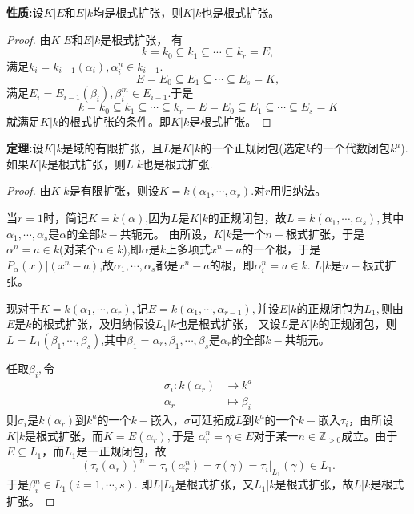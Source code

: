 \documentclass[UTF8]{article}
\begin{document}
\textbf{性质:}设$K|E$和$E|k$均是根式扩张，则$K|k$也是根式扩张。
\begin{proof}
	由$K|E$和$E|k$是根式扩张，
	有
	$$
	k=k_{0}\subseteq k_{1}\subseteq \cdots\subseteq k_{r}=E,
	$$
	满足$k_{i}=k_{i-1}(\alpha_{i}),\alpha_{i}^{n}\in k_{i-1}.$
	$$
	E=E_{0}\subseteq E_{1}\subseteq \cdots\subseteq E_{s}=K,
	$$
	满足$E_{i}=E_{i-1}(\beta_{i}),\beta_{i}^{m}\in E_{i-1}.$于是
	$$
	k=k_{0}\subseteq k_{1}\subseteq \cdots\subseteq k_{r}=E=E_{0}\subseteq E_{1}\subseteq \cdots\subseteq E_{s}=K
	$$
	就满足$K|k$的根式扩张的条件。即$K|k$是根式扩张。
\end{proof}

\textbf{定理:}设$K|k$是域的有限扩张，且$L$是$K|k$的一个正规闭包(选定$k$的一个代数闭包$k^{a}$).如果$K|k$是根式扩张，则$L|k$也是根式扩张.
\begin{proof}
	由$K|k$是有限扩张，则设$K=k(\alpha_{1},\cdots,\alpha_{r}).$对$r$用归纳法。
	
	
	当$r=1$时，简记$K=k(\alpha)$,因为$L$是$K|k$的正规闭包，故$L=k(\alpha_{1},\cdots,\alpha_{s}),$其中$\alpha_{1},\cdots,\alpha_{s}$是$\alpha$的全部$k-$共轭元。
	由所设，$K|k$是一个$n-$根式扩张，于是$\alpha^{n}=a\in k$(对某个$a\in k$),即$\alpha$是$k$上多项式$x^{n}-a$的一个根，于是$P_{\alpha}(x)|(x^{n}-a)$,故$\alpha_{1},\cdots,\alpha_{s}$都是$x^{n}-a$的根，即$\alpha_{i}^{n}=a\in k.$ $L|k$是$n-$根式扩张。
	
	
	现对于$K=k(\alpha_{1},\cdots,\alpha_{r}),$记$E=k(\alpha_{1},\cdots,\alpha_{r-1}),$并设$E|k$的正规闭包为$L_{1},$则由$E$是$k$的根式扩张，及归纳假设$L_{1}|k$也是根式扩张，
	又设$L$是$K|k$的正规闭包，则$L=L_{1}(\beta_{1},\cdots,\beta_{s})$,其中$\beta_{1}=\alpha_{r},\beta_{1},\cdots,\beta_{s}$是$\alpha_{r}$的全部$k-$共轭元。
	
	
	任取$\beta_{i},$令
	\[
	\begin{split}
	\sigma_{i}:k(\alpha_{r})&\rightarrow k^{a}\\
	\alpha_{r}&\mapsto\beta_{i}
	\end{split}
	\]
	则$\sigma_{i}$是$k(\alpha_{r})$到$k^{a}$的一个$k-$嵌入，$\sigma$可延拓成$L$到$k^{a}$的一个$k-$嵌入$\tau_{i}$，由所设$K|k$是根式扩张，而$K=E(\alpha_{r}),$于是
	$\alpha_{r}^{n}=\gamma\in E$对于某一$n\in \mathbb{Z}_{>0}$成立。由于$E\subseteq L_{1}$，而$L_{1}$是一正规闭包，故
	$$
	(\tau_{i}(\alpha_{r}))^{n}=\tau_{i}(\alpha_{r}^{n})=\tau(\gamma)=\tau_{i}|_{L_{1}}(\gamma)\in L_{1}.
	$$
	于是$\beta_{i}^{n}\in L_{1}(i=1,\cdots,s).$
	即$L|L_{1}$是根式扩张，又$L_{1}|k$是根式扩张，故$L|k$是根式扩张。
\end{proof}
\end{document}
